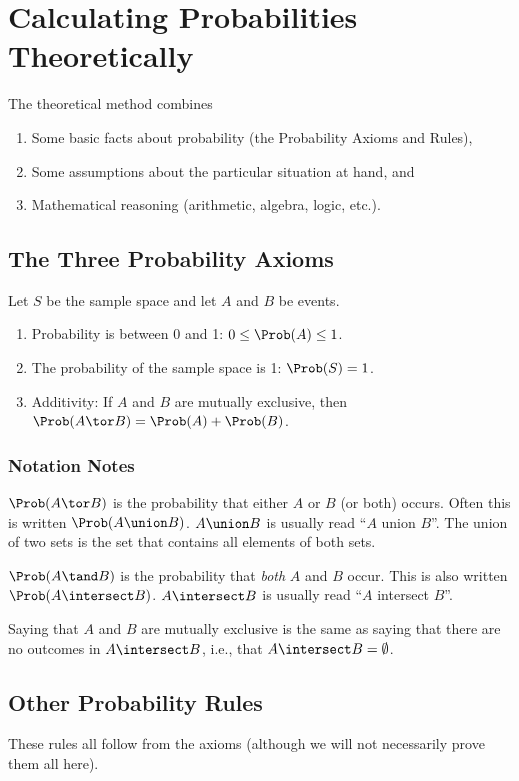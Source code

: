 \documentclass[twoside]{book}\usepackage[]{graphicx}\usepackage[]{xcolor}
\begin{document}
\section{Calculating Probabilities Theoretically}

The theoretical method combines
\begin{enumerate}
\item Some basic facts about probability (the Probability Axioms and Rules),
\item Some assumptions about the particular situation at hand, and 
\item Mathematical reasoning (arithmetic, algebra, logic, etc.).
\end{enumerate}

\subsection{The Three Probability Axioms}

Let $S$ be the sample space and let $A$ and $B$ be events.
\begin{enumerate}
\item Probability is between 0 and 1: $0 \le \Prob(A) \le 1$.
\item The probability of the sample space is 1: $\Prob(S) = 1$.
\item Additivity: 
If $A$ and $B$ are mutually exclusive, then 
$\Prob(A \tor B) = \Prob(A) + \Prob(B)$.
\end{enumerate}

\subsubsection{Notation Notes}
$\Prob(A \tor B)$ is the probability that either $A$ or $B$ (or both) 
occurs.  Often this is written $\Prob(A \union B)$.  $A \union B$ is usually read
``$A$ union $B$''.  The union of two sets is the set that contains all elements of both sets.

$\Prob(A \tand B)$ is the probability that \emph{both} $A$ and $B$ occur.
This is also written $\Prob (A \intersect B)$.  $A \intersect B$ is usually read
``$A$ intersect $B$''.  

Saying that $A$ and $B$ are mutually exclusive is the same as saying that there are no
outcomes in $A\intersect B$, i.e., that $A \intersect B = \emptyset$.

\subsection{Other Probability Rules}
These rules all follow from the axioms (although we will not necessarily prove them all here).
\end{document}
